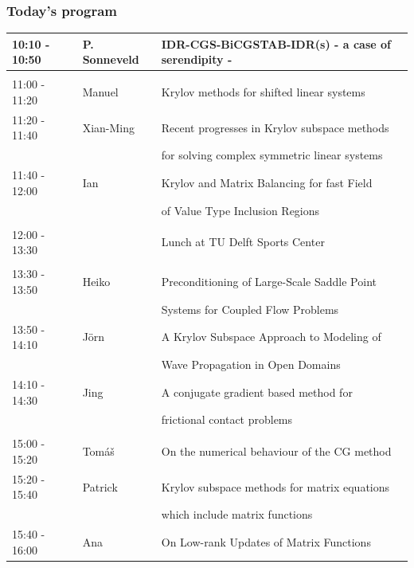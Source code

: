 \documentclass{beamer}
\begin{document}
\begin{frame}
\frametitle{Today's program}
\vspace{-0.2cm}
\tiny
\begin{table}[h]
\begin{tabular}{lll}
10:10 - 10:50 & P. Sonneveld & IDR-CGS-BiCGSTAB-IDR(s) - a case of serendipity -\\ [0.5ex]
\hline \\ [-1.5ex]
11:00 - 11:20 & Manuel & Krylov methods for shifted linear systems \\ [0.5ex]
11:20 - 11:40 & Xian-Ming & Recent progresses in Krylov subspace methods\\ 
                        & & for solving complex symmetric linear systems\\  [0.5ex]
11:40 - 12:00 & Ian & Krylov and Matrix Balancing for fast Field \\ 
              &     & of Value Type Inclusion Regions\\  [0.5ex]
\hline \\ [-1.5ex]
12:00 - 13:30 & & Lunch at TU Delft Sports Center \\ [0.5ex]
\hline \\ [-1.5ex]
13:30 - 13:50 & Heiko & Preconditioning of Large-Scale Saddle Point \\
                    & & Systems for Coupled Flow Problems\\ [0.5ex]
13:50 - 14:10 &J\"orn & A Krylov Subspace Approach to Modeling of \\
                     & & Wave Propagation in Open Domains\\ [0.5ex]
14:10 - 14:30 & Jing & A conjugate gradient based method for \\
                   & & frictional contact problems\\ [0.5ex]
\hline \\ [-1.5ex]
15:00 - 15:20 & Tom{\'a}{\v s} & On the numerical behaviour of the CG method\\ [0.5ex]
15:20 - 15:40 & Patrick & Krylov subspace methods for matrix equations \\
                  & & which include matrix functions\\ [0.5ex]
15:40 - 16:00 & Ana & On Low-rank Updates of Matrix Functions\\ [0.5ex]

\end{tabular}
\end{table}
\end{frame}
\end{document}
